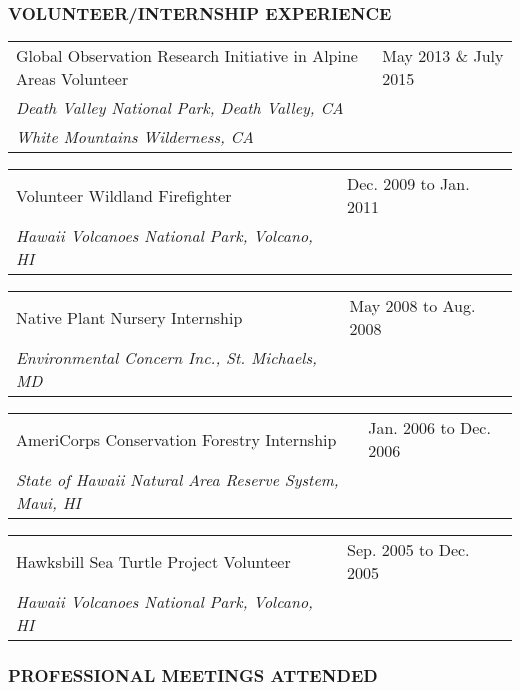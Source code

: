 \documentclass[11pt,english]{article}
\providecommand{\tabularnewline}{\\}
\begin{document}

\subsubsection*{VOLUNTEER/INTERNSHIP EXPERIENCE}
\vspace{-0.5ex}

\begin{tabular}{>{\raggedright}p{4.5in}>{\raggedleft}p{1.5in}}
Global Observation Research Initiative in Alpine Areas Volunteer & May 2013 \& July 2015\tabularnewline
\hspace{1.5em}\emph{Death Valley National Park, Death Valley, CA}\\
\hspace{1.5em}\emph{White Mountains Wilderness, CA}
\end{tabular}

\begin{tabular}{>{\raggedright}p{4in}>{\raggedleft}p{2in}}
Volunteer Wildland Firefighter & Dec. 2009 to Jan. 2011\tabularnewline
\hspace{1.5em}\emph{Hawaii Volcanoes National Park, Volcano, HI}\tabularnewline
\end{tabular}

\begin{tabular}{>{\raggedright}p{4in}>{\raggedleft}p{2in}}
Native Plant Nursery Internship & May 2008 to Aug. 2008 \tabularnewline
\hspace{1.5em}\emph{Environmental Concern Inc., St. Michaels, MD}\tabularnewline
\end{tabular}

\begin{tabular}{>{\raggedright}p{4in}>{\raggedleft}p{2in}}
AmeriCorps Conservation Forestry Internship & Jan. 2006 to Dec. 2006\tabularnewline
\hspace{1.5em}\emph{State of Hawaii Natural Area Reserve System, Maui, HI}\tabularnewline
\end{tabular}

\begin{tabular}{>{\raggedright}p{4in}>{\raggedleft}p{2in}}
Hawksbill Sea Turtle Project Volunteer & Sep. 2005 to Dec. 2005\tabularnewline
\hspace{1.5em}\emph{Hawaii Volcanoes National Park, Volcano, HI}\tabularnewline
\end{tabular}


\subsubsection*{PROFESSIONAL MEETINGS ATTENDED}
\vspace{-0.5ex}
\end{document}
